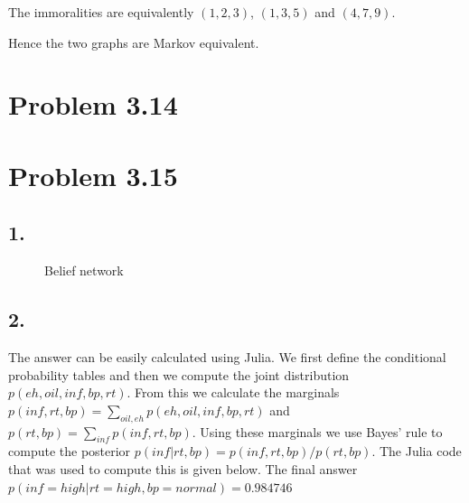 \documentclass[11pt,a4paper,oneside]{report}
\begin{document}
The immoralities are equivalently $\left( 1, 2, 3\right)$, $\left( 1, 3, 5 \right)$ and
$\left( 4, 7, 9 \right)$.

Hence the two graphs are Markov equivalent.

\section*{Problem 3.14}


\section*{Problem 3.15}

\subsection*{1.}
\begin{figure}[H]
  \centering
    \caption{Belief network}
    \label{fig:all_trade_cca_black}     
\end{figure}


\subsection*{2.}

The answer can be easily calculated using Julia. We first define the 
conditional probability tables and then we compute the joint distribution 
$p(eh, oil, inf, bp, rt)$. From this we calculate the marginals $p(inf,rt,bp) 
= \sum_{oil, eh}p(eh, oil, inf, bp, rt)$ and $p(rt,bp) = 
\sum_{inf}p(inf, rt, bp)$. Using these marginals we use Bayes' rule to compute 
the posterior $p(inf|rt, bp) = p(inf, rt, bp)/p(rt, bp)$. The Julia code that 
was used to compute this is given below. The final answer $p(inf = high | rt 
= high, bp = normal) = 0.984746 $\\
\end{document}

